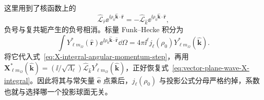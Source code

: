 这里用到了核函数上的
\begin{equation}
\widehat{\bm{\mathcal L}}_{\hat r}
\ee^{\ii\rho_0\hat{\bm k}\cdot\hat{\bm r}}
=-\widehat{\bm{\mathcal L}}_{\hat k}
\ee^{\ii\rho_0\hat{\bm k}\cdot\hat{\bm r}},
\end{equation}
负号与复共轭产生的负号相消。标量 Funk--Hecke 积分为
\begin{equation}
\int Y_{\ell m_\Omega}^*(\hat{\bm r})
\ee^{\ii\rho_0\hat{\bm k}\cdot\hat{\bm r}}\dd\Omega
=4\pi\ii^\ell j_\ell(\rho_0)Y_{\ell m_\Omega}^*(\hat{\bm k}).
\end{equation}
将它代入式~\eqref{eq:X-integral-angular-momentum-step}，再用
$\bm X_{\ell m_\Omega}^*(\hat{\bm k})
=(\ii/\sqrt{\Lambda_\ell})
\widehat{\bm{\mathcal L}}_{\hat k}Y_{\ell m_\Omega}^*(\hat{\bm k})$，正好恢复式~\eqref{eq:vector-plane-wave-X-integral}。因此将其与常矢量 $\hat{\bm e}$ 点乘后，$j_\ell(\rho_0)$ 与投影公式分母严格约掉，系数也就与选择哪一个投影球面无关。

